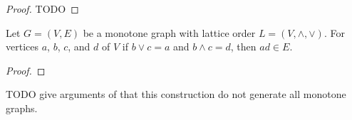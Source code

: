 \begin{proof}
TODO
\end{proof}

\begin{lemma}
Let \(G=(V,E)\) be a monotone graph with lattice order \(L=(V,\wedge, \vee)\)\@.
For vertices \(a\), \(b\), \(c\), and \(d\) of \(V\) if
\(b \vee c  = a\) and \(b \wedge c = d\), then 
\(ad \in E\)\@.
\end{lemma}

\begin{proof}
\end{proof}

TODO give arguments of that this construction do not generate all monotone graphs.